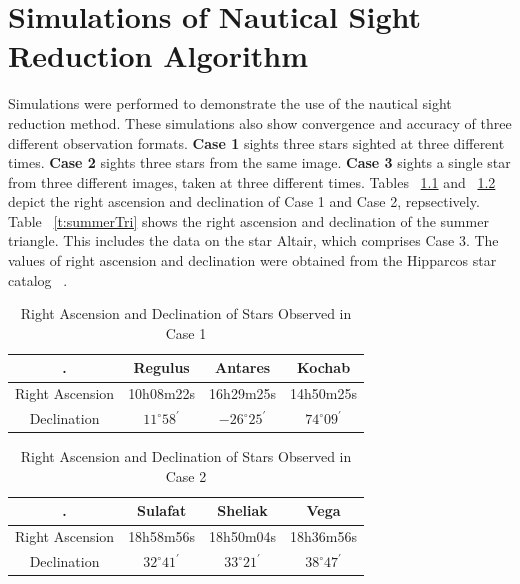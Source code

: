 \documentclass[12pt,a4paper]{book}
\begin{document}
\chapter{Simulations of Nautical Sight Reduction Algorithm}
Simulations were performed to demonstrate the use of the nautical sight reduction method.  These simulations also show convergence and accuracy of three different observation formats.  \textbf{Case 1} sights three stars sighted at three different times.  \textbf{Case 2} sights three stars from the same image. \textbf{Case 3} sights a single star from three different images, taken at three different times.  Tables ~\ref{t:case1} and ~\ref{t:case2} depict the right ascension and declination of Case 1 and Case 2, repsectively.  Table ~\ref{t:summerTri} shows the right ascension and declination of the summer triangle.  This includes the data on the star Altair, which comprises Case 3.  The values of right ascension and declination were obtained from the Hipparcos star catalog ~\cite{b:hipp}.  
\begin{table}[ht!]
\centering
\begin{tabular}{ |c|c|c|c| } 
 \hline
 . & Regulus & Antares & Kochab \\ 
 \hline
 Right Ascension & 10h08m22s & 16h29m25s & 14h50m25s \\ 
 \hline
 Declination & $11^{\circ}58^{'}$ & $-26^{\circ}25^{'}$ & $74^{\circ}09^{'}$ \\ 
 \hline
\end{tabular}
\caption{Right Ascension and Declination of Stars Observed in Case 1}
\label{t:case1}
\end{table}

\begin{table}[ht!]
\centering
\begin{tabular}{ |c|c|c|c| } 
 \hline
 . & Sulafat & Sheliak & Vega\\ 
 \hline
 Right Ascension & 18h58m56s & 18h50m04s & 18h36m56s \\ 
 \hline
 Declination & $32^{\circ}41^{'}$ & $33^{\circ}21^{'}$ & $38^{\circ}47^{'}$ \\ 
 \hline
\end{tabular}
\caption{Right Ascension and Declination of Stars Observed in Case 2}
\label{t:case2}
\end{table}
\end{document}
